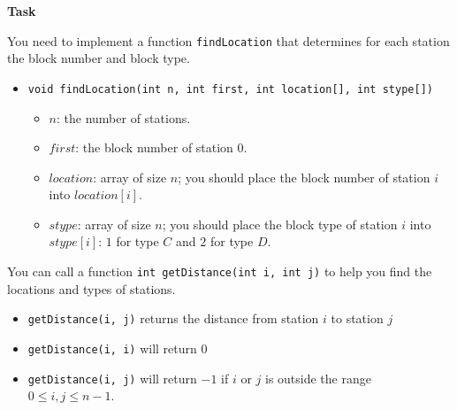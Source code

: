 \textbf{Task}

You need to implement a function \texttt{findLocation} that determines for each station the block number and block type.

\begin{itemize}
\item \texttt{void findLocation(int n, int first, int location[], int stype[])} 
\begin{itemize}
\item $n$: the number of stations.
\item $first$: the block number of station $0$.
\item $location$: array of size $n$; you should place the block number of station $i$ into $location[i]$.
\item $stype$: array of size $n$; you should place the block type of station $i$ into $stype[i]$: $1$ for type $C$ and $2$ for type $D$.
\end{itemize}
\end{itemize}

You can call a function \texttt{int getDistance(int i, int j)} to help you find the locations and types of stations. 

\begin{itemize}
\item \texttt{getDistance(i, j)} returns the distance from station $i$ to station $j$
\item \texttt{getDistance(i, i)} will return $0$
\item \texttt{getDistance(i, j)} will return $-1$ if $i$ or $j$ is outside the range $0 \le i, j \le n - 1$.
\end{itemize}

